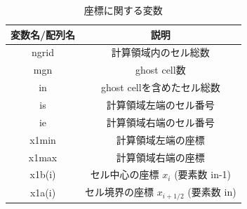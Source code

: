 \begin{table}[h]
\begin{center}
\caption{座標に関する変数}
\begin{tabular}{|c|c|}
    \hline
    変数名/配列名 & 説明 \\
    \hline
    \hline
    {\ttfamily ngrid} & 計算領域内のセル総数 \\
    \hline
    {\ttfamily mgn} & ghost cell数 \\
    \hline
    {\ttfamily in} & ghost cellを含めたセル総数 \\
    \hline
    {\ttfamily is} & 計算領域左端のセル番号\\
    \hline
    {\ttfamily ie} & 計算領域右端のセル番号\\
    \hline
    {\ttfamily x1min} & 計算領域左端の座標 \\
    \hline
    {\ttfamily x1max} & 計算領域右端の座標 \\
    \hline
    {\ttfamily x1b(i)} & セル中心の座標 $x_{i}$ (要素数 {\ttfamily in-1}) \\
    \hline
    {\ttfamily x1a(i)} & セル境界の座標 $x_{i+1/2}$ (要素数 {\ttfamily in}) \\
    \hline
\end{tabular}
\end{center}
\end{table}


